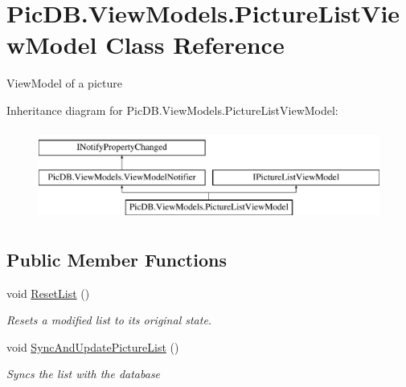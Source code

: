 \hypertarget{class_pic_d_b_1_1_view_models_1_1_picture_list_view_model}{}\section{Pic\+D\+B.\+View\+Models.\+Picture\+List\+View\+Model Class Reference}
\label{class_pic_d_b_1_1_view_models_1_1_picture_list_view_model}


View\+Model of a picture  


Inheritance diagram for Pic\+D\+B.\+View\+Models.\+Picture\+List\+View\+Model\+:\begin{figure}[H]
\begin{center}
\leavevmode
\includegraphics[height=3.000000cm]{class_pic_d_b_1_1_view_models_1_1_picture_list_view_model}
\end{center}
\end{figure}
\subsection*{Public Member Functions}
\begin{DoxyCompactItemize}
\item 
void \mbox{\hyperlink{class_pic_d_b_1_1_view_models_1_1_picture_list_view_model_a5225ed542833b5ce034f5ed1a19389af}{Reset\+List}} ()
\begin{DoxyCompactList}\small\item\em Resets a modified list to its original state. \end{DoxyCompactList}\item 
void \mbox{\hyperlink{class_pic_d_b_1_1_view_models_1_1_picture_list_view_model_a3fa38f6079f8dcf3122962ae515aa7d5}{Sync\+And\+Update\+Picture\+List}} ()
\begin{DoxyCompactList}\small\item\em Syncs the list with the database \end{DoxyCompactList}\end{DoxyCompactItemize}
